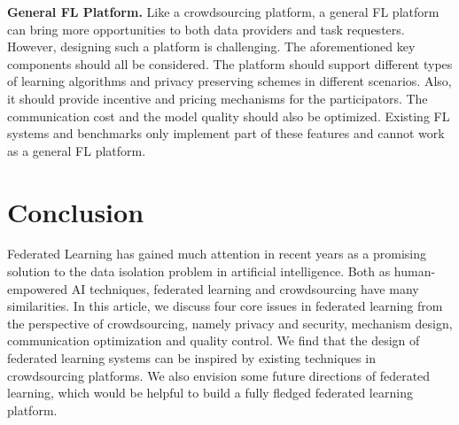 \documentclass[11pt]{article}
\newcommand{\fakeparagraph}[1]{\vspace{1mm}\noindent\textbf{#1.}}
\begin{document}
\fakeparagraph{General FL Platform}
Like a crowdsourcing platform, a general FL platform can bring more opportunities to both data providers and task requesters.
However, designing such a platform is challenging.
The aforementioned key components should all be considered.
The platform should support different types of learning algorithms and privacy preserving schemes in different scenarios.
Also, it should provide incentive and pricing mechanisms for the participators.
The communication cost and the model quality should also be optimized.
Existing FL systems and benchmarks \cite{DBLP:conf/mlsys/BonawitzEGHIIKK19} only implement part of these features and cannot work as a general FL platform.

\section{Conclusion}
Federated Learning has gained much attention in recent years as a promising solution to the data isolation problem in artificial intelligence.
Both as human-empowered AI techniques, federated learning and crowdsourcing have many similarities.
In this article, we discuss four core issues in federated learning from the perspective of crowdsourcing, namely privacy and security, mechanism design, communication optimization and quality control.
We find that the design of federated learning systems can be inspired by existing techniques in crowdsourcing platforms.
We also envision some future directions of federated learning, which would be helpful to build a fully fledged federated learning platform.
\end{document}
